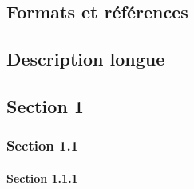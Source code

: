 \documentclass{article}
\begin{document}
\begin{multicols*}{3}
\begin{latexcode}
    \usepackage{caption}    %
    \usepackage{amsmath}    %
    \usepackage{float}      %
    \usepackage{graphicx}   %
    \usepackage{longtable}  %
    \usepackage{booktabs}   %
    \usepackage{tabularx}   %
    \usepackage{listings}   %
    \usepackage{xcolor}     %
    \usepackage{hyperref}   %
    \usepackage{fancyhdr}   %
    \usepackage{geometry}   %
    \usepackage{babel}      %
    \usepackage{siunitx}    %
    \usepackage{tikz}       %
    \usepackage{wrapfig}    %
    \usepackage{subcaption} %
    \usepackage{multicol}   %

\end{latexcode}

\section*{Formats et références}
\begin{latexcode}
    \tableofcontents   %
    \listoffigures     %
    \listoftables      %
    \listoflistings    %
    \index             %
    \printindex        %
    \printglossary     %
    \printbibliography %

    \chapter[Description courte]{Description longue}
    \label{subsec:foobar}
    \section{Section 1}
    \subsection{Section 1.1}
    \subsubsection{Section 1.1.1}

\end{latexcode}
\end{multicols*}
\end{document}

